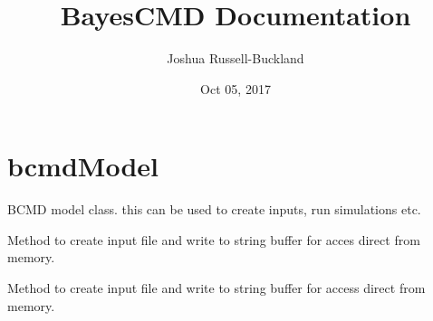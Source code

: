 \documentclass[letterpaper,10pt,english]{sphinxmanual}
\title{BayesCMD Documentation}
\date{Oct 05, 2017}
\author{Joshua Russell-Buckland}
\begin{document}
\maketitle
\sphinxtableofcontents
{}\label{\detokenize{index::doc}}



\chapter{bcmdModel}
\label{\detokenize{bcmdModel::doc}}\label{\detokenize{bcmdModel:welcome-to-bayescmd-s-documentation}}\label{\detokenize{bcmdModel:module-bayescmd.bcmdModel.bcmd_model}}\label{\detokenize{bcmdModel:bcmdmodel}}

\begin{fulllineitems}
\label{\detokenize{bcmdModel:bayescmd.bcmdModel.ModelBCMD}}
BCMD model class. this can be used to create inputs, run simulations etc.

\begin{fulllineitems}
\label{\detokenize{bcmdModel:bayescmd.bcmdModel.ModelBCMD.create_default_input}}
Method to create input file and write to string buffer for acces
direct from memory.

\end{fulllineitems}


\begin{fulllineitems}
\label{\detokenize{bcmdModel:bayescmd.bcmdModel.ModelBCMD.create_initialised_input}}
Method to create input file and write to string buffer for access
direct from memory.

\end{fulllineitems}


\end{fulllineitems}
\end{document}
